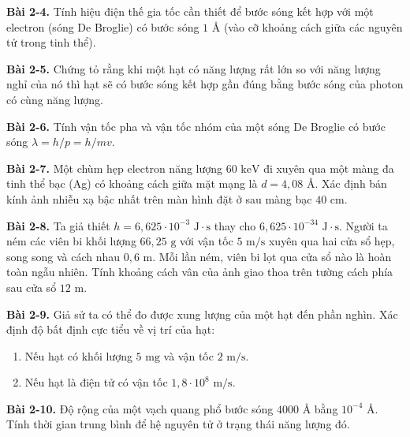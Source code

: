 \expandafter\def\csname debai@2-4\endcsname{
\textbf{Bài 2-4.} Tính hiệu điện thế gia tốc cần thiết để bước sóng kết hợp với một electron (sóng De Broglie) có bước sóng $1\text{ \AA}$ (vào cỡ khoảng cách giữa các nguyên tử trong tinh thể).
}

\expandafter\def\csname debai@2-5\endcsname{
\textbf{Bài 2-5.} Chứng tỏ rằng khi một hạt có năng lượng rất lớn so với năng lượng nghỉ của nó thì hạt sẽ có bước sóng kết hợp gần đúng bằng bước sóng của photon có cùng năng lượng.
}

\expandafter\def\csname debai@2-6\endcsname{
\textbf{Bài 2-6.} Tính vận tốc pha và vận tốc nhóm của một sóng De Broglie có bước sóng $\lambda = h/p = h/mv$.
}

\expandafter\def\csname debai@2-7\endcsname{
\textbf{Bài 2-7.} Một chùm hẹp electron năng lượng $60\text{ keV}$ đi xuyên qua một màng đa tinh thể bạc (Ag) có khoảng cách giữa mặt mạng là $d = 4{,}08\text{ \AA}$. Xác định bán kính ảnh nhiễu xạ bậc nhất trên màn hình đặt ở sau màng bạc $40\text{ cm}$.
}

\expandafter\def\csname debai@2-8\endcsname{
\textbf{Bài 2-8.} Ta giả thiết $h = 6{,}625 \cdot 10^{-3}\text{ J}\cdot\text{s}$ thay cho $6{,}625 \cdot 10^{-34}\text{ J}\cdot\text{s}$. Người ta ném các viên bi khối lượng $66{,}25\text{ g}$ với vận tốc $5\text{ m/s}$ xuyên qua hai cửa sổ hẹp, song song và cách nhau $0{,}6\text{ m}$. Mỗi lần ném, viên bi lọt qua cửa sổ nào là hoàn toàn ngẫu nhiên. Tính khoảng cách vân của ảnh giao thoa trên tường cách phía sau cửa sổ $12\text{ m}$.
}

\expandafter\def\csname debai@2-9\endcsname{
\textbf{Bài 2-9.} Giả sử ta có thể đo được xung lượng của một hạt đến phần nghìn. Xác định độ bất định cực tiểu về vị trí của hạt:
\begin{enumerate}[label=\alph*)]
  \item Nếu hạt có khối lượng $5\text{ mg}$ và vận tốc $2\text{ m/s}$.
  \item Nếu hạt là điện tử có vận tốc $1{,}8 \cdot 10^8\text{ m/s}$.
\end{enumerate}
}

\expandafter\def\csname debai@2-10\endcsname{
\textbf{Bài 2-10.} Độ rộng của một vạch quang phổ bước sóng $4000\text{ \AA}$ bằng $10^{-4}\text{ \AA}$. Tính thời gian trung bình để hệ nguyên tử ở trạng thái năng lượng đó.
}

